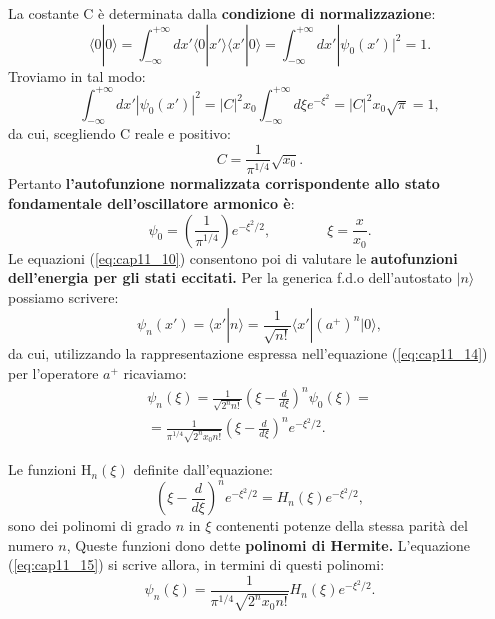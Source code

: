 La costante C è determinata dalla \textbf{condizione di normalizzazione}:
\begin{equation}
\langle 0|0 \rangle=\int_{-\infty}^{+\infty} dx' \langle 0|x'\rangle\langle x'|0 \rangle=\int_{-\infty}^{+\infty} dx' |\psi_0(x')|^2=1.
\end{equation}
Troviamo in tal modo:
\begin{equation}
\int_{-\infty}^{+\infty} dx' |\psi_0(x')|^2=|C|^2x_0\int_{-\infty}^{+\infty} d\xi e^{-\xi^2}=|C|^2 x_0 \sqrt{\pi}=1,
\end{equation}
da cui, scegliendo C reale e positivo:
\begin{equation}
C=\frac{1}{\pi^{{1}/{4}}} \sqrt{x_0}.
\end{equation}
Pertanto \textbf{l'autofunzione normalizzata corrispondente allo stato fondamentale dell'oscillatore armonico è}:
\begin{equation}
\psi_0=\left( \frac{1}{\pi^{{1}/{4}}}  \right) e^{-\xi^2/2}, \qquad \qquad \xi=\frac{x}{x_0}.
\end{equation}
 Le equazioni (\ref{eq:cap11_10}) consentono poi di valutare le \textbf{autofunzioni dell'energia per gli stati eccitati.} Per la generica f.d.o dell'autostato $|n\rangle$ possiamo scrivere:
\begin{equation}
\psi_n(x')=\langle x'|n \rangle=\frac{1}{\sqrt{n!}}\langle x'|(a^+)^n|0 \rangle,
\end{equation}
da cui, utilizzando la rappresentazione espressa nell'equazione (\ref{eq:cap11_14}) per l'operatore $a^+$ ricaviamo:
\begin{equation} \label{eq:cap11_15}
\begin{split}
	\psi_n(\xi)=\frac{1}{\sqrt{2^nn!}}(\xi-\frac{d}{d\xi})^n \psi_0({\xi})=\\
	=\frac{1}{\pi^{1/4}\sqrt{2^nx_0n!}}(\xi-\frac{d}{d\xi})^n e^{-\xi^2/2}.
\end{split} \end{equation}

 Le funzioni H$_n({\xi})$ definite dall'equazione:
\begin{equation}
(\xi-\frac{d}{d\xi})^n e^{-\xi^2/2}=H_n(\xi)e^{-\xi^2/2},
\end{equation}
sono dei polinomi di grado $n$ in $\xi$ contenenti potenze della stessa parità del numero $n$, Queste funzioni dono dette \textbf{polinomi di Hermite.} L'equazione (\ref{eq:cap11_15}) si scrive allora, in termini di questi polinomi:
\begin{equation}
\psi_n(\xi)=\frac{1}{\pi^{1/4}\sqrt{2^nx_0n!}} H_n(\xi)e^{-\xi^2/2}.
\end{equation}

